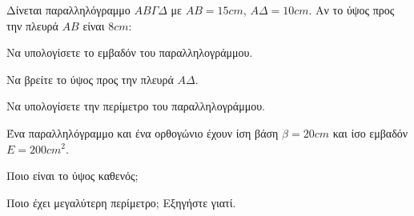 \documentclass[11pt,a4paper,modern]{FFExercises}
\begin{document}
\askhsh Δίνεται παραλληλόγραμμο $AB\varGamma\varDelta$ με $AB=15\si{cm}$, $A\varDelta=10\si{cm}$. Αν το ύψος προς την πλευρά $AB$ είναι $8\si{cm}$:
\begin{center}
\end{center}
\begin{alist}
\item Να υπολογίσετε το εμβαδόν του παραλληλογράμμου.
\item Να βρείτε το ύψος προς την πλευρά $A\varDelta$.
\item Να υπολογίσετε την περίμετρο του παραλληλογράμμου.
\end{alist}

\askhsh Ένα παραλληλόγραμμο και ένα ορθογώνιο έχουν ίση βάση $\beta=20\si{cm}$ και ίσο εμβαδόν $E=200\si{cm^2}$.
\begin{alist}
\item Ποιο είναι το ύψος καθενός;
\item Ποιο έχει μεγαλύτερη περίμετρο; Εξηγήστε γιατί.
\end{alist}
\end{document}

